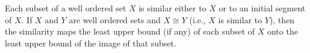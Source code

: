 \begin{named}[Exercise. ] Each subset of a well ordered set $X$ is similar either to $X$ or to an initial segment of $X$. If $X$ and $Y$ are well ordered sets and $X \cong Y$ (i.e., $X$ is similar to $Y$), then the similarity maps the least upper bound (if any) of each subset of $X$ onto the least upper bound of the image of that subset.
\end{named}

